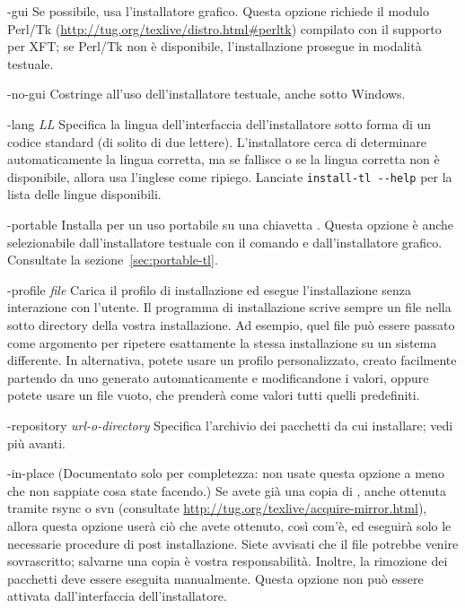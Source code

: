 \documentclass{article}
\begin{document}
\begin{ttdescription}
\item[-gui] Se possibile, usa l'installatore grafico. Questa opzione
  richiede il modulo Perl/Tk
  (\url{http://tug.org/texlive/distro.html#perltk}) compilato con il
  supporto per XFT; se Perl/Tk non è disponibile, l'installazione
  prosegue in modalità testuale.

\item[-no-gui] Costringe all'uso dell'installatore testuale, anche sotto
  Windows.

\item[-lang {\sl LL}] Specifica la lingua dell'interfaccia
  dell'installatore sotto forma di un codice standard (di solito di due
  lettere). L'installatore cerca di determinare automaticamente la lingua
  corretta, ma se fallisce o se la lingua corretta non è disponibile,
  allora usa l'inglese come ripiego. Lanciate \verb|install-tl --help|
  per la lista delle lingue disponibili.

\item[-portable] Installa per un uso portabile su una chiavetta \USB{}.
  Questa opzione è anche selezionabile dall'installatore testuale con il 
  comando
   e dall'installatore grafico. Consultate la
  sezione~\ref{sec:portable-tl}.

\item[-profile {\sl file}] Carica il profilo di installazione  ed
  esegue l'installazione senza interazione con l'utente. Il programma di
  installazione scrive sempre un file  nella sotto
  directory  della vostra installazione. Ad esempio, quel file 
  può essere
  passato come argomento per ripetere esattamente la stessa installazione su
  un sistema differente. In alternativa, potete usare un profilo
  personalizzato, creato facilmente partendo da uno generato automaticamente
  e modificandone i valori, oppure potete usare un file vuoto, che prenderà
  come valori tutti quelli predefiniti.

\item [-repository {\sl url-o-directory}] Specifica l'archivio dei
  pacchetti da cui installare; vedi più avanti.

\item[-in-place] (Documentato solo per completezza: non usate questa
  opzione a meno che non sappiate cosa state facendo.) Se avete già una
  copia di \TL{}, anche ottenuta tramite rsync o svn (consultate
  \url{http://tug.org/texlive/acquire-mirror.html}),
  allora questa opzione userà ciò che avete ottenuto, così com'è, ed
  eseguirà solo le necessarie procedure di post installazione. Siete
  avvisati che il file  potrebbe venire
  sovrascritto; salvarne una copia è vostra responsabilità. Inoltre, la
  rimozione dei pacchetti deve essere eseguita manualmente. Questa
  opzione non può essere attivata dall'interfaccia dell'installatore.
\end{ttdescription}
\end{document}
